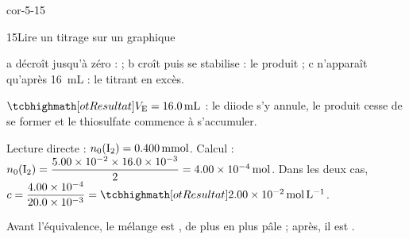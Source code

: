 \begin{blocLivre}{cor-5-15}
\begin{corrige}{15}{Lire un titrage sur un graphique}
\begin{questions}
\item a décroît jusqu'à zéro :  ; b croît puis se stabilise : le produit  ; c n'apparaît qu'après
\qty{16}{mL} : le titrant  en excès.
\item $\res{V_\mathrm{E}=\qty{16,0}{mL}}$ : le diiode s'y annule, le produit cesse de se former et le thiosulfate commence à s'accumuler.
\item Lecture directe : $n_0(\ce{I2})=\qty{0,400}{mmol}$. Calcul : $n_0(\ce{I2})=\dfrac{\num{5.00e-2}\times\num{16.0e-3}}{2}=\qty{4,00e-4}{mol}$. Dans les deux
cas, $c=\dfrac{\num{4.00e-4}}{\num{20.0e-3}}=\res{\qty{2,00e-2}{mol.L^{-1}}}$.
\item Avant l'équivalence, le mélange est , de plus en plus pâle ; après, il est .
\end{questions}
\end{corrige}
\end{blocLivre}
